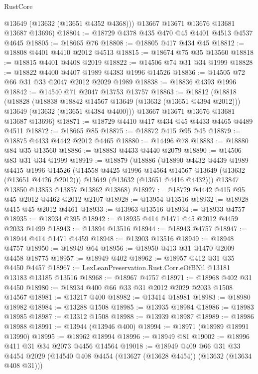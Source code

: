 \begin{lexlean}{RustCore}
\begin{coremodule}
        @13649
        (@13632 (@13651 @4352 @4368)))
      @13667
      @13671
      @13676
      @13681
      @13687
      @13696)
@18804 := @18729 @4378 @435 @470 @45 @4401 @4513 @4537 @4645
@18805 := @18665 @76
@18808 := @18805 @417 @434 @45
@18812 := @18808 @4401 @4410 @2012 @4513
@18815 := @18674 @75 @35 @13560
@18818 := @18815 @4401 @4408 @2019
@18822 := @14506 @74 @31 @34 @1999
@18828 := @18822 @4400 @4407 @1989 @4383 @1996 @14526
@18836 := @14505 @72 @66 @31 @33 @2047 @2012 @2029 @1989
@18838 := @18836 @4393 @1996
@18842 := @14540 @71 @2047 @13753 @13757
@18863 := @18812
    (@18818
      (@18828
        (@18838 @18842 @14567 @13649 (@13632 (@13651 @4394 @2012)))
        @13649
        (@13632 (@13651 @4384 @4400)))
      @13667
      @13671
      @13676
      @13681
      @13687
      @13696)
@18871 := @18729 @4410 @417 @434 @45 @4433 @4465 @4489 @4511
@18872 := @18665 @85
@18875 := @18872 @415 @95 @45
@18879 := @18875 @4433 @4442 @2012 @4465
@18880 := @14496 @78
@18883 := @18880 @84 @35 @13560
@18886 := @18883 @4433 @4440 @2079
@18890 := @14506 @83 @31 @34 @1999
@18919 := @18879
    (@18886
      (@18890
        @4432
        @4439
        @1989
        @4415
        @1996
        @14526
        (@14558 @4425 @1996 @14564 @14567 @13649 (@13632 (@13651 @4426 @2012)))
        @13649
        (@13632 (@13651 @4416 @4432)))
      @13847
      @13850
      @13853
      @13857
      @13862
      @13868)
@18927 := @18729 @4442 @415 @95 @45 @2012 @4462 @2012 @2107
@18928 := @13954 @13516
@18932 := @18928 @415 @45 @2012 @4461
@18933 := @13963 @13516
@18934 := @18933 @4757
@18935 := @18934 @395
@18942 := @18935 @414 @1471 @45 @2012 @4459 @2033 @1499
@18943 := @13894 @13516
@18944 := @18943 @4757
@18947 := @18944 @414 @1471 @4459
@18948 := @13903 @13516
@18949 := @18948 @4757
@18950 := @18949 @64
@18956 := @18950 @413 @31 @1470 @2009 @4458 @18775
@18957 := @18949 @402
@18962 := @18957 @412 @31 @35 @4450 @4457
@18967 := LexLeanPreservation.Rust.Corr.eOfBNil @13181 @13183 @13185 @13516
@18968 := @18967 @4757
@18971 := @18968 @402 @31 @4450
@18980 := @18934 @400 @66 @33 @31 @2012 @2029 @2033 @1508 @14567
@18981 := @13217 @400
@18982 := @13414 @18981
@18983 := @18980 @18982
@18984 := @13288 @1508
@18985 := @13935 @18984
@18986 := @18983 @18985
@18987 := @13312 @1508
@18988 := @13939 @18987
@18989 := @18986 @18988
@18991 := @13944 (@13946 @400)
@18994 := @18971 (@18989 @18991 @13990)
@18995 := @18962 @18994
@18996 := @18949 @81
@19002 := @18996 @411 @31 @34 @2073 @4456 @14564
@19018 := @18949
    @409
    @66
    @31
    @33
    @4454
    @2029
    (@14540 @408 @4454 (@13627 (@13628 @4454)) (@13632 (@13634 @408 @31)))

\end{coremodule}
\end{lexlean}

